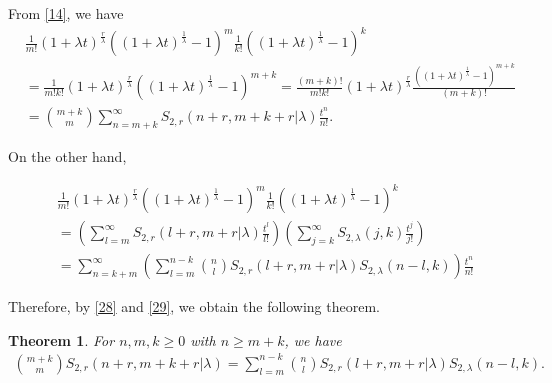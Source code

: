 \documentclass[10pt,twoside,reqno]{amsart}
\numberwithin{equation}{section}
\newtheorem{thm}{\bf Theorem}[section]
\begin{document}
From \eqref{14}, we have
\begin{equation}\begin{split}\label{28}
&\frac{1}{m!} (1+\lambda t)^{\frac{r}{\lambda }} ((1+\lambda t)^{\frac{1}{\lambda }}-1)^m \frac{1}{k!} ((1+\lambda t)^{\frac{1}{\lambda }}-1)^k \\
&= \frac{1}{m!k!} (1+\lambda t)^{\frac{r}{\lambda }} ((1+\lambda t)^{\frac{1}{\lambda }}-1)^{m+k} = \frac{(m+k)!}{m!k!}(1+\lambda t)^{\frac{r}{\lambda}}\frac{((1+\lambda t)^{\frac{1}{\lambda }}-1)^{m+k} }{(m+k)!}\\
&= {m+k \choose m} \sum_{n=m+k}^\infty S_{2,r}(n+r,m+k+r|\lambda ) \frac{t^n}{n!}.
\end{split}\end{equation}

On the other hand,

\begin{equation}\begin{split}\label{29}
&\frac{1}{m!} (1+\lambda t)^{\frac{r}{\lambda }} ((1+\lambda t)^{\frac{1}{\lambda }}-1)^m \frac{1}{k!} ((1+\lambda t)^{\frac{1}{\lambda }}-1)^k \\
&=\left( \sum_{l=m}^\infty S_{2,r} (l+r,m+r|\lambda ) \frac{t^l}{l!} \right) \left( \sum_{j=k}^\infty S_{2,\lambda}(j,k) \frac{t^j}{j!} \right)\\
&= \sum_{n=k+m}^\infty \left( \sum_{l=m}^{n-k} {n \choose l} S_{2,r}(l+r,m+r|\lambda ) S_{2,\lambda }(n-l,k) \right) \frac{t^n}{n!}
\end{split}\end{equation}

Therefore, by \eqref{28} and \eqref{29}, we obtain the following theorem.

\begin{thm}
For $n,m,k \geq 0$ with $n \geq m+k$, we have
\begin{equation*}\begin{split}
 {m+k \choose m} S_{2,r}(n+r,m+k+r|\lambda ) = \sum_{l=m}^{n-k} {n \choose l} S_{2,r}(l+r,m+r|\lambda ) S_{2,\lambda }(n-l,k).
\end{split}\end{equation*}
\end{thm}
\end{document}
